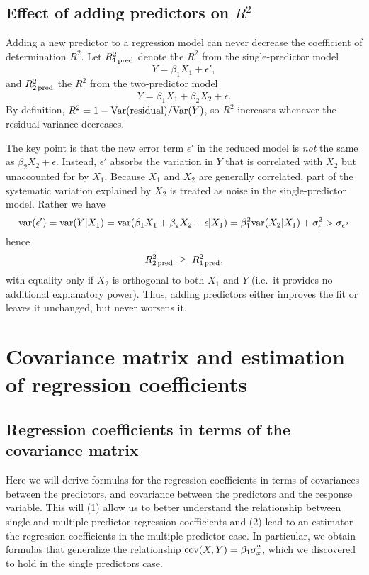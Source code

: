  \subsection{Effect of adding predictors on $R^2$}

Adding a new predictor to a regression model can never decrease the coefficient of determination $R^2$.  
Let $R_{1\,{\rm pred}}^2$ denote the $R^2$ from the single-predictor model
\[
Y = \beta_1 X_1 + \epsilon',
\]
and $R_{2\,{\rm pred}}^2$ the $R^2$ from the two-predictor model
\[
Y = \beta_1 X_1 + \beta_2 X_2 + \epsilon.
\]
By definition, $R^2 = 1 - {\rm Var}(\text{residual})/{\rm Var}(Y)$, so $R^2$ increases whenever the residual variance decreases.

The key point is that the new error term $\epsilon'$ in the reduced model is \emph{not} the same as $\beta_2 X_2 + \epsilon$.  
Instead, $\epsilon'$ absorbs the variation in $Y$ that is correlated with $X_2$ but unaccounted for by $X_1$.  
Because $X_1$ and $X_2$ are generally correlated, part of the systematic variation explained by $X_2$ is treated as noise in the single-predictor model. Rather we have
\begin{equation}
{\rm var}(\epsilon') = {\rm var}(Y|X_1) = {\rm var}(\beta_1 X_1 + \beta_2 X_2 + \epsilon|X_1) = \beta_1^2{\rm var}(X_2|X_1) + \sigma_{\epsilon}^2 > \sigma_{\epsilon^2}
\end{equation}
hence
\[
R_{2\,{\rm pred}}^2 \;\ge\; R_{1\,{\rm pred}}^2,
\]
with equality only if $X_2$ is orthogonal to both $X_1$ and $Y$ (i.e.\ it provides no additional explanatory power).  
Thus, adding predictors either improves the fit or leaves it unchanged, but never worsens it.

 \section{Covariance matrix and estimation of regression coefficients}
 
 \subsection{Regression coefficients in terms of the covariance matrix}
Here we will derive formulas for the regression coefficients in terms of covariances between the predictors, and covariance between the predictors and the response variable. This will (1) allow us to better understand the relationship between single and multiple predictor regression coefficients and (2) lead to an estimator the regression coefficients in the multiple predictor case. In particular, we obtain formulas that generalize the relationship ${\rm cov}(X,Y) = \beta_1\sigma_x^2$, which we discovered to hold in the single predictors case. 


